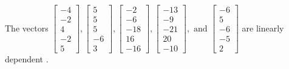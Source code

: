 \begin{exercise}
\begin{exerciseStatement}
  \end{exerciseStatement}
  \begin{exerciseAnswer}
   The vectors \(\left[\begin{array}{r}
-4 \\
-2 \\
4 \\
-2 \\
5
\end{array}\right] , \left[\begin{array}{r}
5 \\
5 \\
5 \\
-6 \\
3
\end{array}\right] , \left[\begin{array}{r}
-2 \\
-6 \\
-18 \\
16 \\
-16
\end{array}\right] , \left[\begin{array}{r}
-13 \\
-9 \\
-21 \\
20 \\
-10
\end{array}\right] , \text{ and } \left[\begin{array}{r}
-6 \\
5 \\
-6 \\
-5 \\
2
\end{array}\right]\) are 
  	 linearly dependent  .
  


  \end{exerciseAnswer}
\end{exercise}